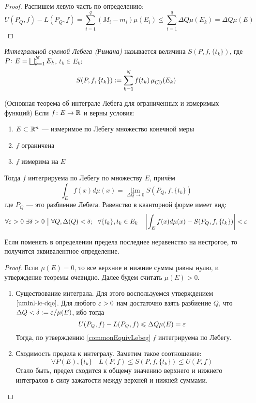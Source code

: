 \begin{proof}
	Распишем левую часть по определению:
	\[
		U(P_Q, f) - L(P_Q, f) = \sum_{i = 1}^q (M_i - m_i)\mu(E_i) \le \sum_{i = 1}^q \Delta Q\mu(E_k) = \Delta Q \mu(E)
	\]
\end{proof}

\begin{definition}
	\textit{Интегральной суммой Лебега (Римана)} называется величина $S(P, f, \{t_k\})$, где $P \colon E = \bigsqcup_{k = 1}^N E_k$, $t_k \in E_k$:
	\[
		S(P, f, \{t_k\}) := \sum_{k = 1}^N f(t_k) \operatorname{\mu_{(\mathfrak{J})}}(E_k)
	\]
\end{definition}

\begin{theorem} (Основная теорема об интеграле Лебега для ограниченных и измеримых функций)
	Если $f \colon E \to \mathbb{R}$ и верны условия:
	\begin{enumerate}
		\item $E \subset \mathbb{R}^n$ --- измеримое по Лебегу множество конечной меры
		
		\item $f$ ограничена
		
		\item $f$ измерима на $E$
	\end{enumerate}
	Тогда $f$ интегрируема по Лебегу по множеству $E$, причём
	\[
		\int_E f(x)d\mu(x) = \lim_{\Delta Q \to 0} S(P_Q, f, \{t_k\})
	\]
	где $P_Q$ --- это разбиение Лебега. Равенство в кванторной форме имеет вид:
	\[
		\forall \varepsilon > 0\ \exists \delta > 0 \ \big|\  \forall Q, \Delta(Q) < \delta;\ \ \forall \{t_k\}, t_k \in E_k \quad \left|\int_E f(x)d\mu(x) - S(P_Q, f, \{t_k\})\right| < \varepsilon
	\]
\end{theorem}

\begin{reminder}
	Если поменять в определении предела последнее неравенство на нестрогое, то получится эквивалентное определение.
\end{reminder}

\begin{proof}
	Если $\mu(E) = 0$, то все верхние и нижние суммы равны нулю, и утверждение теоремы очевидно. Далее будем считать $\mu(E) > 0$.
	\begin{enumerate}
		\item Существование интеграла. Для этого воспользуемся утверждением $\ref{uminl-le-dqe}$. Для любого $\varepsilon > 0$ нам достаточно взять разбиение $Q$, что $\Delta Q < \delta := \varepsilon / \mu(E)$, ибо тогда
		\[
			U(P_Q, f) - L(P_Q, f) \leqslant \Delta Q \mu(E) = \varepsilon
		\]
		Тогда, по утверждению \ref{commonEquivLebeg} $f$ интегрируема по Лебегу.
		
		\item Сходимость предела к интегралу. Заметим такое соотношение:
		\[
			\forall P(E), \{t_k\} \quad L(P, f) \le S(P, f, \{t_k\}) \le U(P, f)
		\]
		Стало быть, предел сходится к общему значению верхнего и нижнего интегралов в силу зажатости между верхней и нижней суммами.
	\end{enumerate}
\end{proof}

